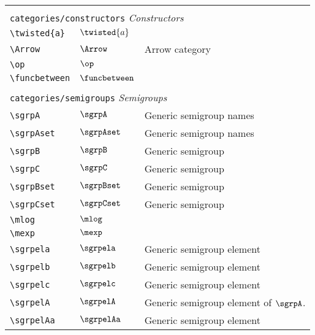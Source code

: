 \begin{longtable}{lll}
  &  & \\ 
 \multicolumn{3}{l}{{\color[rgb]{0.5,0.5,0.5}\texttt{categories/constructors}} \emph{Constructors}}\\ 
 \hline
{\color[rgb]{0.5,0.5,0.5}\texttt{\textbackslash twisted\{a\}}} & $\twisted{a}$ & \\ 
 {\color[rgb]{0.5,0.5,0.5}\texttt{\textbackslash Arrow}} & $\Arrow$ &  Arrow category\\ 
 {\color[rgb]{0.5,0.5,0.5}\texttt{\textbackslash op}} & $\op$ & \\ 
 {\color[rgb]{0.5,0.5,0.5}\texttt{\textbackslash funcbetween}} & $\funcbetween$ & \\ 
  &  & \\ 
 \multicolumn{3}{l}{{\color[rgb]{0.5,0.5,0.5}\texttt{categories/semigroups}} \emph{Semigroups}}\\ 
 \hline
{\color[rgb]{0.5,0.5,0.5}\texttt{\textbackslash sgrpA}} & $\sgrpA$ &  Generic semigroup names\\ 
 {\color[rgb]{0.5,0.5,0.5}\texttt{\textbackslash sgrpAset}} & $\sgrpAset$ &  Generic semigroup names\\ 
 {\color[rgb]{0.5,0.5,0.5}\texttt{\textbackslash sgrpB}} & $\sgrpB$ &  Generic semigroup\\ 
 {\color[rgb]{0.5,0.5,0.5}\texttt{\textbackslash sgrpC}} & $\sgrpC$ &  Generic semigroup\\ 
 {\color[rgb]{0.5,0.5,0.5}\texttt{\textbackslash sgrpBset}} & $\sgrpBset$ &  Generic semigroup\\ 
 {\color[rgb]{0.5,0.5,0.5}\texttt{\textbackslash sgrpCset}} & $\sgrpCset$ &  Generic semigroup\\ 
 {\color[rgb]{0.5,0.5,0.5}\texttt{\textbackslash mlog}} & $\mlog$ & \\ 
 {\color[rgb]{0.5,0.5,0.5}\texttt{\textbackslash mexp}} & $\mexp$ & \\ 
 {\color[rgb]{0.5,0.5,0.5}\texttt{\textbackslash sgrpela}} & $\sgrpela$ &  Generic semigroup element\\ 
 {\color[rgb]{0.5,0.5,0.5}\texttt{\textbackslash sgrpelb}} & $\sgrpelb$ &  Generic semigroup element\\ 
 {\color[rgb]{0.5,0.5,0.5}\texttt{\textbackslash sgrpelc}} & $\sgrpelc$ &  Generic semigroup element\\ 
 {\color[rgb]{0.5,0.5,0.5}\texttt{\textbackslash sgrpelA}} & $\sgrpelA$ &  Generic semigroup element of $\sgrpA$.\\ 
 {\color[rgb]{0.5,0.5,0.5}\texttt{\textbackslash sgrpelAa}} & $\sgrpelAa$ &  Generic semigroup element\\ 

\end{longtable}
